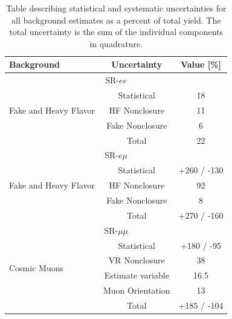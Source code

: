 \begin{table}[htb]
\small
\begin{center}
\begin{tabular}{|l|c|c|}
Background & Uncertainty & Value [\%] \\
\hline
\multicolumn{3}{|c|}{SR-$ee$} \\
\hline
\multirow{3}{*}{Fake and Heavy Flavor} 	& Statistical 	& 18 \\
 						& HF Nonclosure & 11 \\
 						& Fake Nonclosure& 6 \\
 						& Total 		& 22 \\
\hline
\multicolumn{3}{|c|}{SR-$e\mu$} \\
\hline
\multirow{3}{*}{Fake and Heavy Flavor} 	& Statistical 	& +260 / -130 \\
 						& HF Nonclosure & 92 \\ 
 						& Fake Nonclosure & 8 \\
 						& Total 		& +270 / -160 \\
\hline
\multicolumn{3}{|c|}{SR-$\mu\mu$} \\
\hline
\multirow{4}{*}{Cosmic Muons} 	& Statistical 			& +180 / -95 \\
 								& VR Nonclosure		& 38 \\
 								& Estimate variable		& 16.5 \\
 								& Muon Orientation      & 13  \\
 								& Total 				& +185 / -104 \\
\hline
\end{tabular}
\caption{Table describing statistical and systematic uncertainties for all background estimates as a percent of total yield. The total uncertainty is the sum of the individual components in quadrature.
}
\label{tab:uncertainties}
\end{center}
\end{table}





